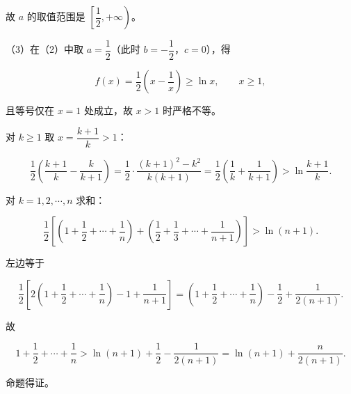 \begin{answer}
故 $a$ 的取值范围是 $\left[\dfrac12,+\infty\right)$。

（3）在（2）中取 $a=\dfrac12$（此时 $b=-\dfrac12$，$c=0$），得

\nopagebreak[4]
\[f(x)=\frac12\left(x-\frac1x\right)\geqslant\ln x,\qquad x\geqslant1,\]

且等号仅在 $x=1$ 处成立，故 $x>1$ 时严格不等。

对 $k\geqslant1$ 取 $x=\dfrac{k+1}{k}>1$：

\nopagebreak[4]
\[\frac12\left(\frac{k+1}{k}-\frac{k}{k+1}\right)
=\frac12\cdot\frac{(k+1)^2-k^2}{k(k+1)}
=\frac12\left(\frac1k+\frac1{k+1}\right)>\ln\frac{k+1}{k}.\]

对 $k=1,2,\cdots,n$ 求和：

\nopagebreak[4]
\[\frac12\left[\left(1+\frac12+\cdots+\frac1n\right)+\left(\frac12+\frac13+\cdots+\frac1{n+1}\right)\right]>\ln(n+1).\]

左边等于

\nopagebreak[4]
\[\frac12\left[2\left(1+\frac12+\cdots+\frac1n\right)-1+\frac1{n+1}\right]
=\left(1+\frac12+\cdots+\frac1n\right)-\frac12+\frac1{2(n+1)}.\]

故

\nopagebreak[4]
\[1+\frac12+\cdots+\frac1n>\ln(n+1)+\frac12-\frac1{2(n+1)}
=\ln(n+1)+\frac{n}{2(n+1)}.\]

命题得证。

\gkanswer{答案：（1）$b=a-1$，$c=1-2a$；（2）$a\in\left[\dfrac12,+\infty\right)$；（3）证明见解析。}

\end{answer}